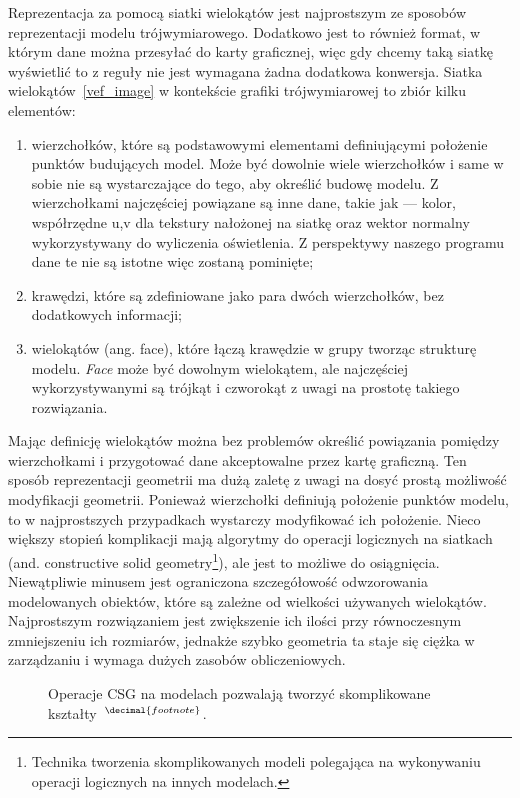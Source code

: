 Reprezentacja za pomocą siatki wielokątów\cite{link11}\cite{link12} jest
najprostszym ze sposobów reprezentacji modelu trójwymiarowego. Dodatkowo jest to
również format, w którym dane można przesyłać do karty graficznej, więc gdy
chcemy taką siatkę wyświetlić to z reguły nie jest wymagana żadna dodatkowa
konwersja. Siatka wielokątów~\ref{vef_image} w kontekście grafiki trójwymiarowej to
zbiór kilku elementów:
\begin{enumerate}
  \item wierzchołków, które są podstawowymi elementami definiującymi położenie
  punktów budujących model. Może być dowolnie wiele wierzchołków i same w sobie
  nie są wystarczające do tego, aby określić budowę modelu. Z wierzchołkami
  najczęściej powiązane są inne dane, takie jak --- kolor, współrzędne u,v dla
  tekstury nałożonej na siatkę oraz wektor normalny wykorzystywany do wyliczenia
  oświetlenia. Z perspektywy naszego programu dane te nie są istotne więc
  zostaną pominięte;
  \item krawędzi, które są zdefiniowane jako para dwóch wierzchołków, bez
  dodatkowych informacji;
  \item wielokątów (ang. face), które łączą krawędzie w grupy tworząc
  strukturę modelu. \emph{Face} może być dowolnym wielokątem, ale najczęściej
  wykorzystywanymi są trójkąt i czworokąt z uwagi na prostotę takiego rozwiązania.
\end{enumerate}
Mając definicję wielokątów można bez problemów określić powiązania pomiędzy
wierzchołkami i przygotować dane akceptowalne przez kartę graficzną.
Ten sposób reprezentacji geometrii ma dużą zaletę z uwagi na dosyć prostą
możliwość modyfikacji geometrii. Ponieważ wierzchołki definiują położenie 
punktów modelu, to w najprostszych przypadkach wystarczy modyfikować ich
położenie. Nieco większy stopień komplikacji mają algorytmy do operacji
logicznych na siatkach (and. constructive solid geometry\footnote{Technika
tworzenia skomplikowanych modeli polegająca na wykonywaniu operacji logicznych
na innych modelach.}), ale jest to możliwe do osiągnięcia. Niewątpliwie minusem
jest ograniczona szczegółowość odwzorowania modelowanych obiektów, które są
zależne od wielkości używanych wielokątów. Najprostszym
rozwiązaniem jest zwiększenie ich ilości przy równoczesnym zmniejszeniu ich
rozmiarów, jednakże szybko geometria ta staje się ciężka w zarządzaniu i wymaga
dużych zasobów obliczeniowych.
{
\begin{figure}[h]
  \centering
  \label{csg_image}
  \caption{Operacje CSG na modelach pozwalają tworzyć skomplikowane
  kształty~$^{\decimal{footnote}}$.}
\end{figure}
}
